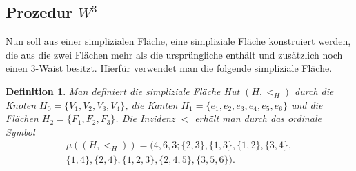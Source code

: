 \documentclass[12pt,titlepage]{article}
\newtheorem{definition}{Definition}[section]
\begin{document}
\subsection{Prozedur $W^3$}
Nun soll aus einer simplizialen Fläche, eine simpliziale Fläche konstruiert werden, die aus die zwei Flächen mehr als die ursprüngliche enthält und zusätzlich noch einen 3-Waist besitzt. Hierfür verwendet man die folgende simpliziale Fläche.

\begin{definition}
Man definiert die simpliziale Fläche \emph{Hut} $(H,<_{H})$ durch die Knoten $H_0=\{V_1,V_2,V_3,V_4\}$, die Kanten $H_1=\{e_1,e_2,e_3,e_4,e_5,e_6\}$ und die Flächen $H_2=\{F_1,F_2,F_3\}$. Die Inzidenz $<$ erhält man durch das ordinale Symbol
\begin{align*}
\mu((H,<_H))=(4,6,3;\{2,3\},\{1,3\},\{1,2\},\{3,4\},\\
\{1,4\},\{2,4\},
 \{1,2,3\},\{2,4,5\},\{3,5,6\}).
\end{align*}
\end{definition}
\end{document}
